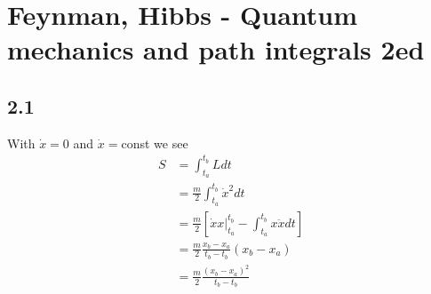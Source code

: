 \documentclass[../main.tex]{subfiles}
\begin{document}
\section{{\sc Feynman, Hibbs} - Quantum mechanics and path integrals 2ed}
\subsection{2.1}
With $\dot x=0$ and $\dot x=$const we see
\begin{align}
    S&=\int_{t_a}^{t_b}L dt\\
    &=\frac{m}{2}\int_{t_a}^{t_b}\dot x^2 dt\\
    &=\frac{m}{2}\left[\left.\dot x x\right|_{t_a}^{t_b}-\int_{t_a}^{t_b} x\ddot xdt\right]\\
    &=\frac{m}{2}\frac{x_b-x_a}{t_b-t_b}(x_b-x_a)\\
     &=\frac{m}{2}\frac{(x_b-x_a)^2}{t_b-t_b}
\end{align}
\end{document}
